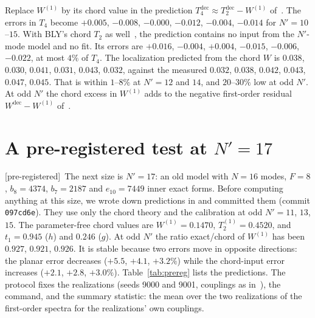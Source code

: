 \documentclass[11pt]{article}
\newcommand{\Np}{N'}
\newcommand{\Wone}{W^{(1)}}
\newcommand{\dec}{\mathrm{dec}}
\newcommand{\tagbox}[2]{\textsf{\small\color{#1}[#2]}}
\newcommand{\PRE}{\tagbox{cnum}{pre-registered}}
\theoremstyle{plain}
\theoremstyle{remark}
\numberwithin{equation}{section}
\begin{document}
Replace $\Wone$ by its chord value in the prediction $T_4^\dec\approx T_2^\dec-\Wone$ of~\cite{prog1013}. The errors in
$T_4$ become $+0.005$, $-0.008$, $-0.000$, $-0.012$, $-0.004$, $-0.014$ for $\Np=10$--$15$. With BLY's chord $T_2$ as
well~\cite[\S9.3]{prog1013}, the prediction contains no input from the $\Np$-mode model and no fit. Its errors are
$+0.016$, $-0.004$, $+0.004$, $-0.015$, $-0.006$, $-0.022$, at most $4\%$ of $T_4$. The localization predicted from the
chord $W$ is $0.038$, $0.030$, $0.041$, $0.031$, $0.043$, $0.032$, against the measured $0.032$, $0.038$, $0.042$,
$0.043$, $0.047$, $0.045$. That is within $1$--$8\%$ at $\Np=12$ and $14$, and $20$--$30\%$ low at odd $\Np$. At odd
$\Np$ the chord excess in $\Wone$ adds to the negative first-order residual $W^\dec-\Wone$ of~\cite{prog1013}.

\section{A pre-registered test at \texorpdfstring{$\Np=17$}{N'=17}}\label{sec:N17}

\PRE\ The next size is $\Np=17$: an old model with $N=16$ modes, $F=8$, $b_8=4374$, $b_7=2187$ and $e_{10}=7449$ inner
exact forms. Before computing anything at this size, we wrote down predictions in
 and committed them (commit \texttt{097cd6e}). They use
only the chord theory and the calibration at odd $\Np=11$, $13$, $15$. The parameter-free chord values are
$\Wone=0.1470$, $T_2^{(1)}=0.4520$, and $t_1=0.945$ ($h$) and $0.246$ ($g$). At odd $\Np$ the ratio exact/chord of
$\Wone$ has been $0.927$, $0.921$, $0.926$. It is stable because two errors move in opposite directions: the planar
error decreases ($+5.5$, $+4.1$, $+3.2\%$) while the chord-input error increases ($+2.1$, $+2.8$, $+3.0\%$).
Table~\ref{tab:prereg} lists the predictions. The protocol fixes the realizations (seeds 9000 and 9001, couplings as
in~\cite{prog1013}), the command, and the summary statistic: the mean over the two realizations of the first-order
spectra for the realizations' own couplings.
\end{document}

